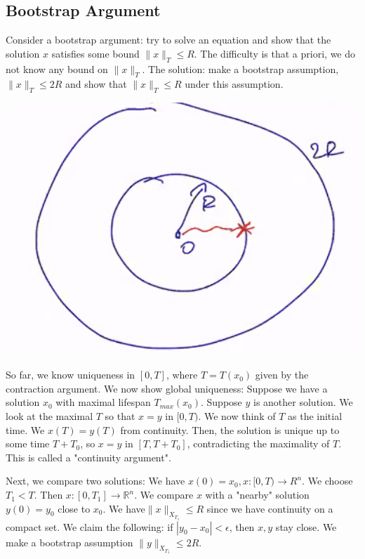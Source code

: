 \documentclass[11pt]{scrartcl}
\newcommand{\R}{\mathbb{R}}
\begin{document}
\subsection{Bootstrap Argument}
Consider a bootstrap argument:  try to solve an equation and show that the solution $x$ satisfies some bound $\|x\|_T \le R$.  The difficulty is that a priori, we do not know any bound on $\|x\|_T$.  The solution:  make a bootstrap assumption, $\|x\|_T \le 2R$ and show that $\|x \|_T \le R$ under this assumption.  
\begin{center}
\includegraphics[scale=0.5]{bootstrap.png}
\end{center}

So far, we know uniqueness in $[0, T]$, where $T=T(x_0)$ given by the contraction argument.  We now show global uniqueness:  Suppose we have a solution $x_0$ with maximal lifespan $T_{max}(x_0)$.   Suppose $y$ is another solution.  We look at the maximal $T$ so that $x = y$ in $[0, T)$.  We now think of $T$ as the initial time.  We $x(T) = y(T)$ from continuity. Then, the solution is unique up to some time $T+T_0$, so $x = y$ in $[T, T+T_0]$, contradicting the maximality of $T$.  This is called a "continuity argument".

Next, we compare two solutions:  We have $x(0) = x_0, x: [0, T) \rightarrow R^n$.  We choose $T_1 < T$.  Then $x: [0, T_1] \rightarrow \R^n$.  We compare $x$ with a "nearby" solution $y(0) = y_0$ close to $x_0$.  We have$\|x\|_{X_{T_1}} \le R$ since we have continuity on a compact set.  We claim the following: if $|y_0 - x_0| < \epsilon$, then $x, y$ stay close.  We make a bootstrap assumption $\|y\|_{X_{T_1}} \le 2R$.  
\end{document}
